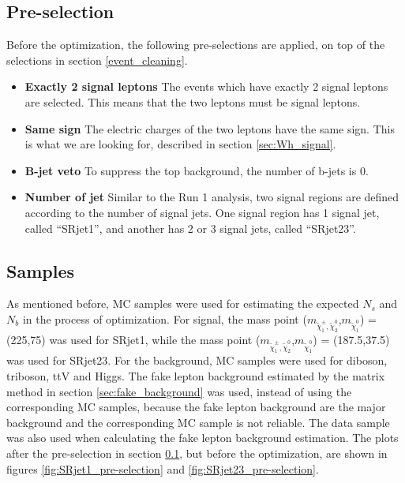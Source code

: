 \subsection{Pre-selection}
\label{sec:SR_pre-selection}
Before the optimization, the following pre-selections are applied, on top of the selections in section \ref{event_cleaning}.
\begin{itemize}
\item \textbf{Exactly 2 signal leptons} The events which have exactly 2 signal leptons are selected. This means that the two leptons must be signal leptons.
\item \textbf{Same sign} The electric charges of the two leptons have the same sign. This is what we are looking for, described in section \ref{sec:Wh_signal}.
\item \textbf{B-jet veto} To suppress the top background, the number of b-jets is 0.
\item \textbf{Number of jet} Similar to the Run 1 analysis, two signal regions are defined according to the number of signal jets. One signal region has 1 signal jet, called ``SRjet1'', and another has 2 or 3 signal jets, called ``SRjet23''.
\end{itemize}

\subsection{Samples}
As mentioned before, MC samples were used for estimating the expected $N_s$ and $N_b$ in the process of optimization.
For signal, the mass point ($m_{\tilde{\chi}_1^\pm , \tilde{\chi}_2^0}$,$m_{\tilde{\chi}_1^0}$) = (225,75) was used for SRjet1, while the mass point ($m_{\tilde{\chi}_1^\pm , \tilde{\chi}_2^0}$,$m_{\tilde{\chi}_1^0}$) = (187.5,37.5) was used for SRjet23.
For the background, MC samples were used for diboson, triboson, ttV and Higgs.
The fake lepton background estimated by the matrix method in section \ref{sec:fake_background} was used, instead of using the corresponding MC samples, because the fake lepton background are the major background and the corresponding MC sample is not reliable.
The data sample was also used when calculating the fake lepton background estimation.
The plots after the pre-selection in section \ref{sec:SR_pre-selection}, but before the optimization, are shown in figures \ref{fig:SRjet1_pre-selection} and \ref{fig:SRjet23_pre-selection}.

